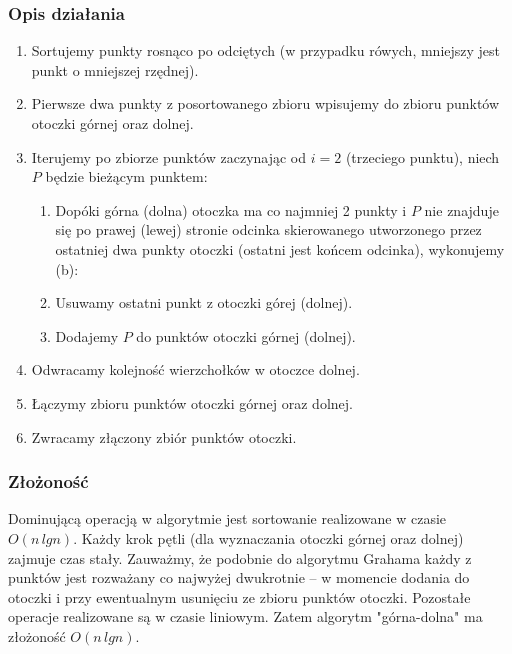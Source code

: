 \documentclass[11pt]{article}
\theoremstyle{remark} \newtheorem{definition}{def.}
\theoremstyle{definition} \newtheorem{twierdzenie}{tw.}
\begin{document}
    \subsubsection{Opis działania}
    \begin{enumerate}
        \item   Sortujemy punkty rosnąco po odciętych (w przypadku rówych, mniejszy jest punkt o mniejszej rzędnej).
        \item   Pierwsze dwa punkty z posortowanego zbioru wpisujemy do zbioru punktów otoczki górnej oraz dolnej.
        \item   Iterujemy po zbiorze punktów zaczynając od $i = 2$ (trzeciego punktu), niech $P$ będzie bieżącym punktem:
                \begin{enumerate}
                    \item   Dopóki górna (dolna) otoczka ma co najmniej 2 punkty i $P$ nie znajduje się po prawej (lewej) stronie odcinka skierowanego utworzonego przez ostatniej
                            dwa punkty otoczki (ostatni jest końcem odcinka), wykonujemy (b):
                    \item   Usuwamy ostatni punkt z otoczki górej (dolnej).
                    \item   Dodajemy $P$ do punktów otoczki górnej (dolnej).
                \end{enumerate}
        \item   Odwracamy kolejność wierzchołków w otoczce dolnej.
        \item   Łączymy zbioru punktów otoczki górnej oraz dolnej.
        \item   Zwracamy złączony zbiór punktów otoczki. 
    \end{enumerate}


    \subsubsection{Złożoność}
    
    Dominującą operacją w algorytmie jest sortowanie realizowane w czasie $O(n \, lgn)$. Każdy krok pętli (dla wyznaczania otoczki górnej oraz dolnej) zajmuje czas stały. Zauważmy, że podobnie do 
    algorytmu Grahama każdy z punktów jest rozważany co najwyżej dwukrotnie -- w momencie dodania do otoczki i przy ewentualnym usunięciu ze zbioru punktów otoczki. Pozostałe operacje realizowane są w 
    czasie liniowym. Zatem algorytm "górna-dolna" ma złożoność $O(n \, lgn)$.
\end{document}
